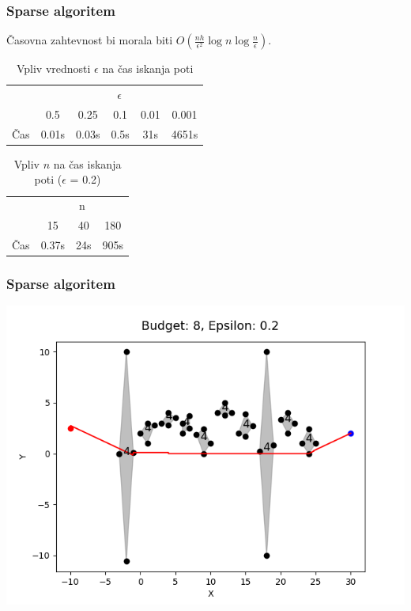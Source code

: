 \documentclass{beamer}
\begin{document}
\begin{frame}
    \frametitle{Sparse algoritem}

    Časovna zahtevnost bi morala biti $O(\frac{nh}{\epsilon^2} \log n \log \frac{n}{\epsilon})$.

    \begin{table}[h]
        \centering
        \begin{tabular}{|c|c|c|c|c|c|}
            \hline
            & \multicolumn{5}{c|}{$\epsilon$} \\
            \cline{2-6}
            & 0.5 & 0.25 & 0.1 & 0.01 & 0.001 \\
            \hline
            Čas & 0.01s & 0.03s & 0.5s & 31s & 4651s \\
            \hline
        \end{tabular}
        \caption{Vpliv vrednosti $\epsilon$ na čas iskanja poti}
    \end{table}

    \begin{table}[h]
        \centering
        \begin{tabular}{|c|c|c|c|}
            \hline
            & \multicolumn{3}{c|}{n} \\
            \cline{2-4}
            & 15 & 40 & 180 \\
            \hline
            Čas & 0.37s & 24s &  905s \\
            \hline
        \end{tabular}
        \caption{Vpliv $n$ na čas iskanja poti ($\epsilon$ = 0.2)}

    \end{table}
    
\end{frame}

\begin{frame}
    \frametitle{Sparse algoritem}

    \includegraphics[width=1\textwidth]{pr4_5.png}


\end{frame}
\end{document}
